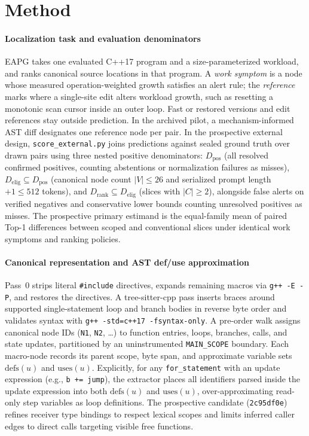 \section{Method}
\label{sec:method}

\paragraph{Localization task and evaluation denominators}
EAPG takes one evaluated C++17 program and a size-parameterized workload, and ranks canonical source locations in that program. A \emph{work symptom} is a node whose measured operation-weighted growth satisfies an alert rule; the \emph{reference} marks where a single-site edit alters workload growth, such as resetting a monotonic scan cursor inside an outer loop. Fast or restored versions and edit references stay outside prediction. In the archived pilot, a mechanism-informed AST diff designates one reference node per pair. In the prospective external design, \texttt{score\_external.py} joins predictions against sealed ground truth over drawn pairs using three nested positive denominators: $D_{\mathrm{pos}}$ (all resolved confirmed positives, counting abstentions or normalization failures as misses), $D_{\mathrm{elig}} \subseteq D_{\mathrm{pos}}$ (canonical node count $|V|\le 26$ and serialized prompt length $+1 \le 512$ tokens), and $D_{\mathrm{rank}} \subseteq D_{\mathrm{elig}}$ (slices with $|C|\ge 2$), alongside false alerts on verified negatives and conservative lower bounds counting unresolved positives as misses. The prospective primary estimand is the equal-family mean of paired Top-1 differences between scoped and conventional slices under identical work symptoms and ranking policies.

\paragraph{Canonical representation and AST def/use approximation}
Pass~0 strips literal \texttt{\#include} directives, expands remaining macros via \texttt{g++ -E -P}, and restores the directives. A tree-sitter-cpp pass inserts braces around supported single-statement loop and branch bodies in reverse byte order and validates syntax with \texttt{g++ -std=c++17 -fsyntax-only}. A pre-order walk assigns canonical node IDs (\texttt{N1}, \texttt{N2}, \dots) to function entries, loops, branches, calls, and state updates, partitioned by an uninstrumented \texttt{MAIN\_SCOPE} boundary. Each macro-node records its parent scope, byte span, and approximate variable sets $\mathrm{defs}(u)$ and $\mathrm{uses}(u)$. Explicitly, for any \texttt{for\_statement} with an update expression (e.g., \texttt{b += jump}), the extractor places all identifiers parsed inside the update expression into both $\mathrm{defs}(u)$ and $\mathrm{uses}(u)$, over-approximating read-only step variables as loop definitions. The prospective candidate (\texttt{2c95df0e}) refines receiver type bindings to respect lexical scopes and limits inferred caller edges to direct calls targeting visible free functions.

